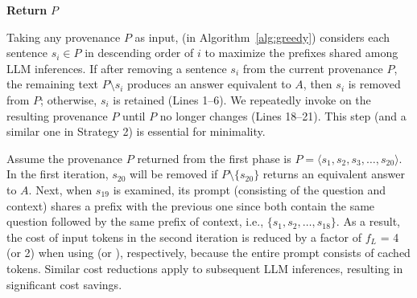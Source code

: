 \begin{algorithm}[bt]
\scriptsize
\caption{[]}
\label{alg:greedy}
\textbf{Return} $P$
\end{algorithm}

 Taking any provenance $P$ as input,  (in Algorithm~\ref{alg:greedy}) considers each sentence $s_i \in P$ in descending order of $i$ to maximize the prefixes shared among LLM inferences. If after removing a sentence $s_i$ from the current provenance $P$, the remaining text $P \setminus s_i$ produces an answer equivalent to $A$, then $s_i$ is removed from $P$; otherwise, $s_i$ is retained (Lines 1–6). We repeatedly invoke  on the resulting provenance $P$ until $P$ no longer changes (Lines 18–21). This step (and a similar one in Strategy 2) is essential for minimality. 

\begin{example}
    Assume the provenance $P$ returned from the first phase is $P = \langle s_1, s_2, s_3, \dots, s_{20} \rangle$. In the first iteration, $s_{20}$ will be removed if $P \setminus \{s_{20}\}$ returns an equivalent answer to $A$. Next, when  $s_{19}$ is examined, its prompt (consisting of the question and context) shares a prefix with the previous one since both contain the same question followed by the same prefix of context, i.e., $\{s_1, s_2, \dots, s_{18}\}$. As a result, the cost of input tokens in the second iteration is reduced by a factor of $f_L$ = 4 (or 2) when using  (or ), respectively, because the entire prompt consists of cached tokens. Similar cost reductions apply to subsequent LLM inferences, resulting in significant cost savings. 
\end{example}



